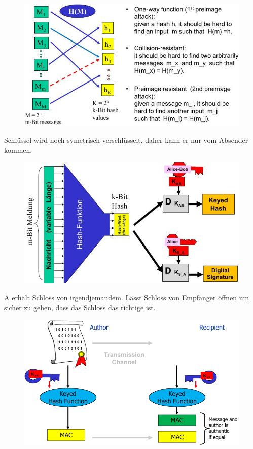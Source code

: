 \documentclass[ngerman,a4paper,12pt]{scrreprt}
\begin{document}
\begin{figure}[H]
	\centering
	\includegraphics[width=\textwidth]{img/V6.5.jpg}
	\label{}
\end{figure}

Schlüssel wird noch symetrisch verschlüsselt, daher kann er nur vom Absender kommen.
\begin{figure}[H]
	\centering
	\includegraphics[width=\textwidth]{img/V6.6.jpg}
	\label{}
\end{figure}

\ol
	\li A erhält Schloss von irgendjemandem. 
	\li Lässt Schloss von Empfänger öffnen um sicher zu gehen, dass das Schloss das richtige ist.
\olE

\begin{figure}[H]
	\centering
	\includegraphics[width=\textwidth]{img/V6.7.jpg}
	\label{}
\end{figure}
\end{document}
